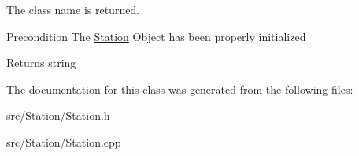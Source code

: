 The class\textquotesingle{} name is returned. 

\begin{DoxyPrecond}{Precondition}
The \hyperlink{classStation}{Station} Object has been properly initialized 
\end{DoxyPrecond}
\begin{DoxyReturn}{Returns}
string 
\end{DoxyReturn}


The documentation for this class was generated from the following files\+:\begin{DoxyCompactItemize}
\item 
src/\+Station/\hyperlink{Station_8h}{Station.\+h}\item 
src/\+Station/Station.\+cpp\end{DoxyCompactItemize}
